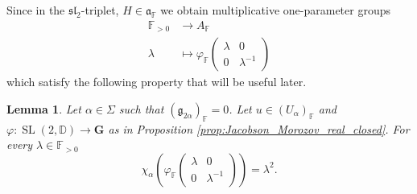 \documentclass[12pt]{amsart}
\newcommand{\F}{\mathbb{F} }
\newcommand{\D}{\mathbb{D} }
\newcommand{\frakg}{\mathfrak{g}}
\newcommand{\fraka}{\mathfrak{a}}
\newcommand{\bG}{\mathbf{G}}
\numberwithin{equation}{section}
\newtheorem{lemma}[theorem]{Lemma}
\theoremstyle{remark} %
\begin{document}
Since in the $\mathfrak{sl}_2$-triplet, $H \in \fraka_\F$ we obtain multiplicative one-parameter groups
\begin{align*}
	\F_{>0} & \to A_\F \\
\lambda &\mapsto \varphi_\F\begin{pmatrix}
	\lambda & 0 \\ 0 & \lambda^{-1}
\end{pmatrix} 	
\end{align*}
which satisfy the following property that will be useful later.
\begin{lemma}\label{lem:Jacobson_Morozov_oneparam}
	Let $\alpha \in \Sigma$ such that $(\frakg_{2\alpha})_\F = 0$. Let $u\in (U_\alpha)_\F$ and $\varphi \colon \operatorname{SL}(2,\D) \to \bG$ as in Proposition \ref{prop:Jacobson_Morozov_real_closed}. For every $\lambda \in \F_{>0}$
	$$
	\chi_\alpha \left(\varphi_\F \begin{pmatrix}
		\lambda & 0 \\ 0 & \lambda^{-1}
	\end{pmatrix} \right) = \lambda^2.
	$$
\end{lemma}
\end{document}
